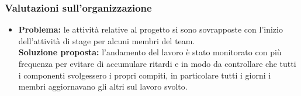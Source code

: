 \subsubsection{Valutazioni sull'organizzazione}
\begin{itemize}
	\item \textbf{Problema:} le attività relative al progetto si sono sovrapposte con l'inizio dell'attività di stage per alcuni membri del team.\\
	\textbf{Soluzione proposta:} l'andamento del lavoro è stato monitorato con più frequenza per evitare di accumulare ritardi e in modo da controllare che tutti i componenti svolgessero i propri compiti, in particolare tutti i giorni i membri aggiornavano gli altri sul lavoro svolto.
\end{itemize}
